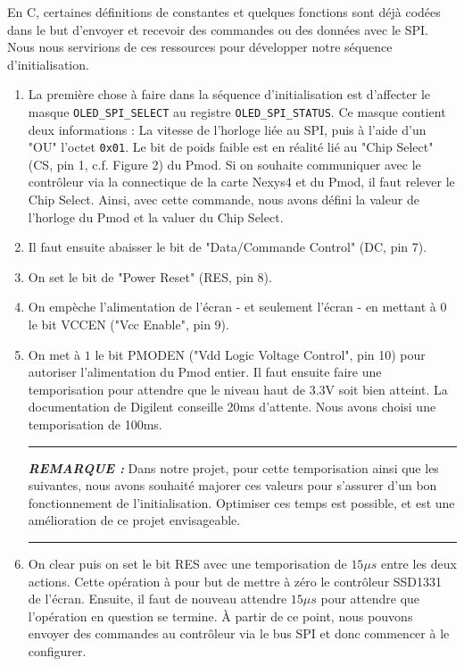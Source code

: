 \documentclass[11pt]{article}
\newcommand{\HRule}{\rule{\linewidth}{0.5mm}}
\newenvironment{rmq}[1] {\noindent\HRule\par\vspace{5pt}\textbf{\textit{REMARQUE : }}#1}{\\\HRule\par\vspace{5pt}}
\begin{document}
En C, certaines définitions de constantes et quelques fonctions sont déjà codées dans le but d'envoyer et recevoir des commandes ou des données avec le SPI. Nous nous servirions de ces ressources pour développer notre séquence d'initialisation. 

\begin{enumerate}

    \item La première chose à faire dans la séquence d'initialisation est d'affecter le masque \texttt{OLED\_SPI\_SELECT} au registre \texttt{OLED\_SPI\_STATUS}. Ce masque contient deux informations : La vitesse de l'horloge liée au SPI, puis à l'aide d'un "OU" l'octet \texttt{0x01}. Le bit de poids faible est en réalité lié au "Chip Select" (CS, pin 1, c.f. Figure 2) du Pmod. Si on souhaite communiquer avec le contrôleur via la connectique de la carte Nexys4 et du Pmod, il faut relever le Chip Select. Ainsi, avec cette commande, nous avons défini la valeur de l'horloge du Pmod et la valuer du Chip Select.
    \item Il faut ensuite abaisser le bit de "Data/Commande Control" (DC, pin 7). %
    \item On set le bit de "Power Reset" (RES, pin 8). 
    \item On empèche l'alimentation de l'écran - et seulement l'écran - en mettant à $0$ le bit VCCEN ("Vcc Enable", pin 9). 
    \item On met à $1$ le bit PMODEN ("Vdd Logic Voltage Control", pin 10) pour autoriser l'alimentation du Pmod entier. Il faut ensuite faire une temporisation pour attendre que le niveau haut de $3.3\text{V}$ soit bien atteint. La documentation de Digilent conseille 20ms d'attente. Nous avons choisi une temporisation de 100ms. 

    \begin{rmq}
    Dans notre projet, pour cette temporisation ainsi que les suivantes, nous avons souhaité majorer ces valeurs pour s'assurer d'un bon fonctionnement de l'initialisation. Optimiser ces temps est possible, et est une amélioration de ce projet envisageable. 
    \end{rmq}

    \item On clear puis on set le bit RES avec une temporisation de $15 \mu s$ entre les deux actions. Cette opération à pour but de mettre à zéro le contrôleur SSD1331 de l'écran. Ensuite, il faut de nouveau attendre $15 \mu s$ pour attendre que l'opération en question se termine. À partir de ce point, nous pouvons envoyer des commandes au contrôleur via le bus SPI et donc commencer à le configurer. 


\end{enumerate}
\end{document}
